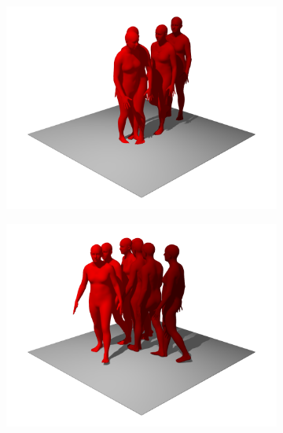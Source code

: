 \begin{figure}[H]
    \centering
    \begin{subfigure}{0.32\linewidth}
        \includegraphics[width=\linewidth]{figures/results/single-runs1.png}
    \end{subfigure}
    \hfill
    \begin{subfigure}{0.32\linewidth}
        \includegraphics[width=\linewidth]{figures/results/single-runs2.png}
    \end{subfigure}
    \hfill
    \begin{subfigure}{0.32\linewidth}

\end{subfigure}
\end{figure}
